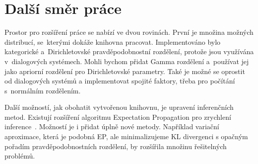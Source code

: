 \section*{Další směr práce}

Prostor pro rozšíření práce se nabízí ve dvou rovinách. 
První je množina možných distribucí, se~kterými dokáže knihovna pracovat.
Implementováno bylo kategorické a~Dirichletovské pravděpodobnostní rozdělení, protože jsou využívána v~dialogových systémech.
Mohli bychom přidat Gamma rozdělení a~používat jej jako apriorní rozdělení pro Dirichletovské parametry.
Také je možné se oprostit od dialogových systémů a implementovat spojité faktory, třeba pro počítání s~normálním rozdělením.

Další možností, jak obohatit vytvořenou knihovnu, je upravení inferenčních metod.
Existují rozšíření algoritmu Expectation Propagation pro zrychlení inference~\cite{seeger2010fast}.
Možností je i přidat úplně nové metody.
Například variační aproximace, která je podobná EP, ale minimalizujeme KL divergenci s opačným pořadím pravděpodobnostních rozdělení, by rozšířila množinu řešitelných problémů.
